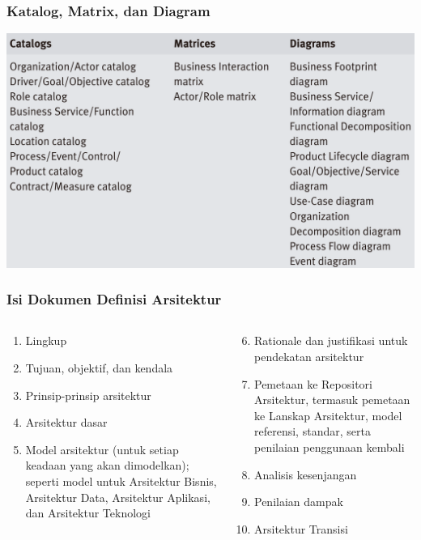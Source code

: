 \documentclass[aspectratio=169]{beamer}
\begin{document}
	{
		\begin{frame}
			\centering
			\frametitle{Katalog, Matrix, dan Diagram}
			\includegraphics[width=.8\textwidth]{../figures/catalogs_matrices_diagrams.png}
		\end{frame}
	}
	
	\begin{frame}
		\frametitle{Isi Dokumen Definisi Arsitektur}
		\begin{columns}
			\begin{column}{0.5\textwidth}
				\begin{center}
					\begin{enumerate}
						\item Lingkup
						\item Tujuan, objektif, dan kendala
						\item Prinsip-prinsip arsitektur
						\item Arsitektur dasar
						\item Model arsitektur (untuk setiap keadaan yang akan dimodelkan); seperti model untuk Arsitektur Bisnis, Arsitektur Data, Arsitektur Aplikasi, dan Arsitektur Teknologi
						
					\end{enumerate}
				\end{center}
			\end{column}
			\begin{column}{0.5\textwidth}
				\begin{center}
					\begin{enumerate}
						\setcounter{enumi}{5}
						\item Rationale dan justifikasi untuk pendekatan arsitektur
						\item Pemetaan ke Repositori Arsitektur, termasuk pemetaan ke Lanskap Arsitektur, model referensi, standar, serta penilaian penggunaan kembali
						\item Analisis kesenjangan
						\item Penilaian dampak
						\item Arsitektur Transisi
					\end{enumerate}
				\end{center}
			\end{column}
		\end{columns}
	\end{frame}
	
\end{document}
